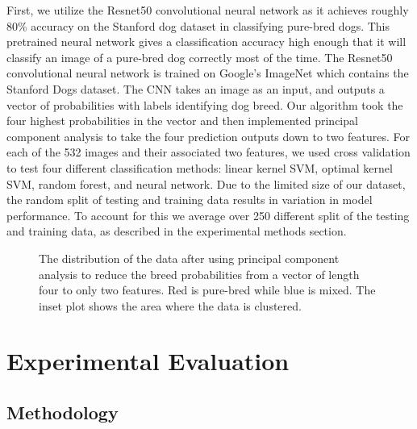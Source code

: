 \documentclass[12pt]{article}
\begin{document}
First, we utilize the Resnet50 convolutional neural network \cite{he2015deep} as it achieves roughly 80\% accuracy on the Stanford dog dataset in classifying pure-bred dogs. This pretrained neural network gives a classification accuracy high enough that it will classify an image of a pure-bred dog correctly most of the time. The Resnet50 convolutional neural network is trained on Google's ImageNet which contains the Stanford Dogs dataset. The CNN takes an image as an input, and outputs a vector of probabilities with labels identifying dog breed. Our algorithm took the four highest probabilities in the vector and then implemented principal component analysis to take the four prediction outputs down to two features. For each of the 532 images and their associated two features, we used cross validation to test four different classification methods: linear kernel SVM, optimal kernel SVM, random forest, and neural network. Due to the limited size of our dataset, the random split of testing and training data results in variation in model performance. To account for this we average over 250 different split of the testing and training data, as described in the experimental methods section.

\begin{figure}[H]
\caption{The distribution of the data after using principal component analysis to reduce the breed probabilities from a vector of length four to only two features. Red is pure-bred while blue is mixed. The inset plot shows the area where the data is clustered.}
\end{figure}

\section{Experimental Evaluation}

\subsection{Methodology}
\end{document}
